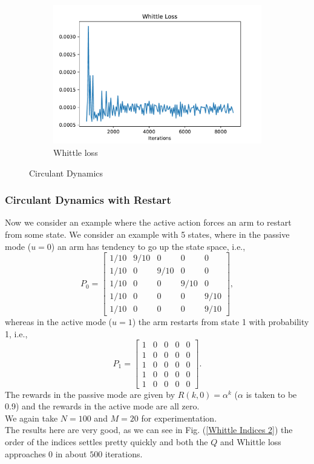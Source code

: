 \documentclass{article}
\theoremstyle{definition}
\begin{document}
\begin{figure}[H]
     \begin{subfigure}{0.48\linewidth}
         \centering
         \includegraphics[width=1\linewidth]{images/whittle1/Whittle Loss.pdf}
         \caption{Whittle loss}
         \label{}
     \end{subfigure}
     \caption{Circulant Dynamics}
     \label{}
\end{figure}
\subsubsection{Circulant Dynamics with Restart}
Now we consider an example where the active action forces an arm
to restart from some state. We consider an example with 5 states,
where in the passive mode ($u=0$) an arm has tendency to go up the state space, i.e.,
$$
P_0=\left[\begin{array}{ccccc}
1/10 & 9/10 & 0 & 0 & 0\\
1/10 & 0 & 9/10 & 0 & 0\\
1/10 & 0 & 0 & 9/10 & 0\\
1/10 & 0 & 0 & 0 & 9/10\\
1/10 & 0 & 0 & 0 & 9/10
\end{array}\right],
$$
whereas in the active mode ($u=1$) the arm restarts from state 1 with probability 1, i.e.,
$$
P_1=\left[\begin{array}{ccccc}
1 & 0 & 0 & 0 & 0\\
1 & 0 & 0 & 0 & 0\\
1 & 0 & 0 & 0 & 0\\
1 & 0 & 0 & 0 & 0\\
1 & 0 & 0 & 0 & 0
\end{array}\right].
$$
The rewards in the passive mode are given by $R(k,0)=\alpha^k$ ($\alpha$ is taken to be 0.9) and the rewards in the active mode are all zero.\\
We again take $N=100$ and $M=20$ for experimentation. \\
The results here are very good, as we can see in Fig. (\ref{Whittle Indices 2}) the order of the indices settles pretty quickly and both the $Q$ and Whittle loss approaches $0$ in about $500$ iterations.
\end{document}
